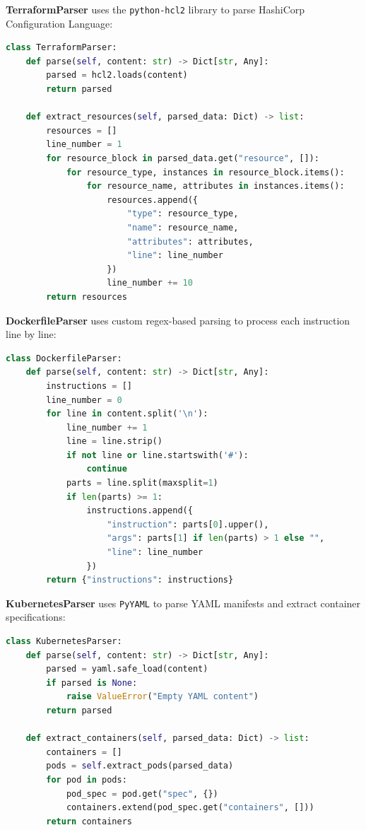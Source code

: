 \vspace{0.3cm}
\noindent\textbf{TerraformParser} uses the \texttt{python-hcl2} library to parse HashiCorp Configuration Language:

\begin{lstlisting}[language=Python, caption={TerraformParser — parsing HCL and extracting resources}, label={lst:tf-parser}]
class TerraformParser:
    def parse(self, content: str) -> Dict[str, Any]:
        parsed = hcl2.loads(content)
        return parsed

    def extract_resources(self, parsed_data: Dict) -> list:
        resources = []
        line_number = 1
        for resource_block in parsed_data.get("resource", []):
            for resource_type, instances in resource_block.items():
                for resource_name, attributes in instances.items():
                    resources.append({
                        "type": resource_type,
                        "name": resource_name,
                        "attributes": attributes,
                        "line": line_number
                    })
                    line_number += 10
        return resources
\end{lstlisting}

\noindent\textbf{DockerfileParser} uses custom regex-based parsing to process each instruction line by line:

\begin{lstlisting}[language=Python, caption={DockerfileParser — line-by-line instruction extraction}, label={lst:docker-parser}]
class DockerfileParser:
    def parse(self, content: str) -> Dict[str, Any]:
        instructions = []
        line_number = 0
        for line in content.split('\n'):
            line_number += 1
            line = line.strip()
            if not line or line.startswith('#'):
                continue
            parts = line.split(maxsplit=1)
            if len(parts) >= 1:
                instructions.append({
                    "instruction": parts[0].upper(),
                    "args": parts[1] if len(parts) > 1 else "",
                    "line": line_number
                })
        return {"instructions": instructions}
\end{lstlisting}

\noindent\textbf{KubernetesParser} uses \texttt{PyYAML} to parse YAML manifests and extract container specifications:

\begin{lstlisting}[language=Python, caption={KubernetesParser — YAML parsing and container extraction}, label={lst:k8s-parser}]
class KubernetesParser:
    def parse(self, content: str) -> Dict[str, Any]:
        parsed = yaml.safe_load(content)
        if parsed is None:
            raise ValueError("Empty YAML content")
        return parsed

    def extract_containers(self, parsed_data: Dict) -> list:
        containers = []
        pods = self.extract_pods(parsed_data)
        for pod in pods:
            pod_spec = pod.get("spec", {})
            containers.extend(pod_spec.get("containers", []))
        return containers
\end{lstlisting}


